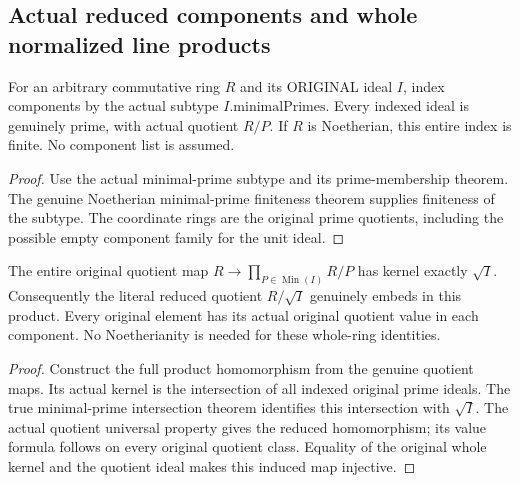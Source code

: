 \subsection{Actual reduced components and whole normalized line products}
\label{subsec:normalized-line-products}

\begin{definition}
\label{algebra:actual-minimal-component-index}
\leanok
For an arbitrary commutative ring $R$ and its ORIGINAL ideal $I$, index
components by the actual subtype $I.\mathrm{minimalPrimes}$. Every indexed
ideal is genuinely prime, with actual quotient $R/P$. If $R$ is
Noetherian, this entire index is finite. No component list is assumed.
\end{definition}
\begin{proof}
Use the actual minimal-prime subtype and its prime-membership theorem.
The genuine Noetherian minimal-prime finiteness theorem supplies finiteness
of the subtype. The coordinate rings are the original prime quotients,
including the possible empty component family for the unit ideal.
\end{proof}

\begin{theorem}
\label{algebra:reduced-component-whole-embedding}
\leanok
{}
The entire original quotient map $R\to\prod_{P\in\operatorname{Min}(I)}R/P$
has kernel exactly $\sqrt I$. Consequently the literal reduced quotient
$R/\sqrt I$ genuinely embeds in this product. Every original element has
its actual original quotient value in each component. No Noetherianity
is needed for these whole-ring identities.
\end{theorem}
\begin{proof}
Construct the full product homomorphism from the genuine quotient maps.
Its actual kernel is the intersection of all indexed original prime
ideals. The true minimal-prime intersection theorem identifies this
intersection with $\sqrt I$. The actual quotient universal property
gives the reduced homomorphism; its value formula follows on every
original quotient class. Equality of the original whole kernel and the
quotient ideal makes this induced map injective.
\end{proof}

